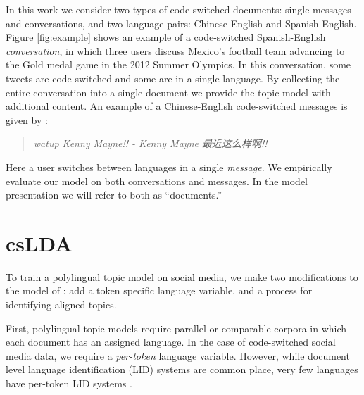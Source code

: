 \documentclass[11pt]{article}
\begin{document}
In this work we consider two types of code-switched documents: single messages and conversations, and two
language pairs: Chinese-English and Spanish-English. 
Figure \ref{fig:example} shows an example of a code-switched Spanish-English {\em conversation}, in which three users discuss
Mexico's football team advancing to the Gold medal game in the 2012 Summer Olympics.
In this conversation, some tweets are code-switched and some are in a single language. By collecting the entire
conversation into a single document we provide the topic model with additional content.
An example of a Chinese-English code-switched messages is given by :
\begin{quote}
\begin{CJK}{UTF8}{gbsn} 
\textit{watup Kenny Mayne!! - Kenny Mayne 最近这么样啊!!}
\end{CJK} 
\end{quote}
Here a user switches between languages in a single {\em message}. We empirically evaluate our
model on both conversations and messages. In the model presentation we will refer
to both as ``documents.''





\section{csLDA}
To train a polylingual topic model on social media, we
make two modifications to the model of : add a token specific language variable, and a process for identifying aligned
topics.

First, polylingual topic models require parallel or comparable corpora in which each document has an assigned 
language. In the case of code-switched social media data, we require a {\em per-token} language variable.
However, while document level language identification (LID) systems are common place, very few languages have
per-token LID systems \cite{king2013labeling,Lignos:13}.
\end{document}
